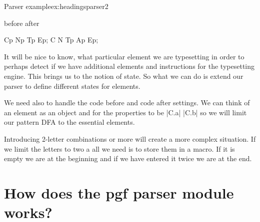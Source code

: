 \begin{texexample}{Parser example}{ex:headingsparser2}
\bgroup
\makeatletter
{}
          
{\boxanelement{\LARGE\chaptername}}
{\boxanelement{\LARGE\thechapter}} 
{} 
{\breakline} 
{before } 
{after } 

{}

{}

{}

\def\boxanelement#1{\fbox{\LARGE#1 }}
\def\breakline{\par\nointerlineskip}
Cp Np Tp Ep;
\medskip
{}C N Tp Ap Ep;
\makeatother
\egroup
\end{texexample}

It will be nice to know, what particular element we are typesetting in order to perhaps detect if we have additional elements and instructions for the typesetting engine. This brings us to the notion of state. So what we can do is extend our parser to define different states for elements. 

We need also to handle the code before and code after settings. We can think of an element as an object and for the properties to be |C.a| |C.b| so we will limit our pattern DFA to the essential elements. 

Introducing 2-letter combinations or more will create a more complex situation. If we limit the letters to two a
all we need is to store them in a macro. If it is empty we are at the beginning and if we have entered it twice we are at the end. 

\section{How does the pgf parser module works?}

